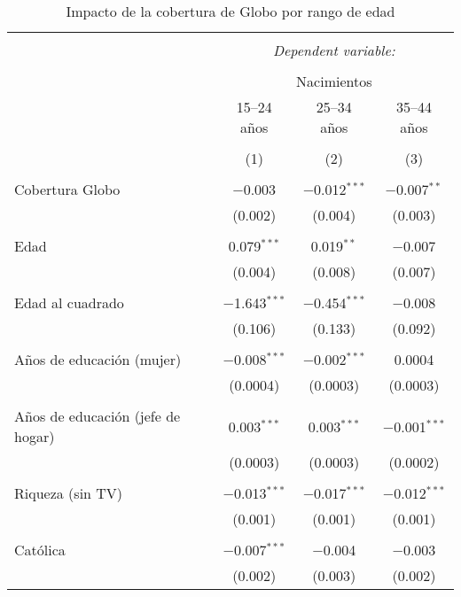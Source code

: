 
\begin{table}[!htbp] \centering 
  \caption{Impacto de la cobertura de Globo por rango de edad} 
  \label{} 
\begin{tabular}{@{\extracolsep{5pt}}lccc} 
\\[-1.8ex]\hline 
\hline \\[-1.8ex] 
 & \multicolumn{3}{c}{\textit{Dependent variable:}} \\ 
\cline{2-4} 
\\[-1.8ex] & \multicolumn{3}{c}{Nacimientos} \\ 
 & 15–24 años & 25–34 años & 35–44 años \\ 
\\[-1.8ex] & (1) & (2) & (3)\\ 
\hline \\[-1.8ex] 
 Cobertura Globo & $-$0.003 & $-$0.012$^{***}$ & $-$0.007$^{**}$ \\ 
  & (0.002) & (0.004) & (0.003) \\ 
  & & & \\ 
 Edad & 0.079$^{***}$ & 0.019$^{**}$ & $-$0.007 \\ 
  & (0.004) & (0.008) & (0.007) \\ 
  & & & \\ 
 Edad al cuadrado & $-$1.643$^{***}$ & $-$0.454$^{***}$ & $-$0.008 \\ 
  & (0.106) & (0.133) & (0.092) \\ 
  & & & \\ 
 Años de educación (mujer) & $-$0.008$^{***}$ & $-$0.002$^{***}$ & 0.0004 \\ 
  & (0.0004) & (0.0003) & (0.0003) \\ 
  & & & \\ 
 Años de educación (jefe de hogar) & 0.003$^{***}$ & 0.003$^{***}$ & $-$0.001$^{***}$ \\ 
  & (0.0003) & (0.0003) & (0.0002) \\ 
  & & & \\ 
 Riqueza (sin TV) & $-$0.013$^{***}$ & $-$0.017$^{***}$ & $-$0.012$^{***}$ \\ 
  & (0.001) & (0.001) & (0.001) \\ 
  & & & \\ 
 Católica & $-$0.007$^{***}$ & $-$0.004 & $-$0.003 \\ 
  & (0.002) & (0.003) & (0.002) \\ 

\end{tabular}
\end{table}

